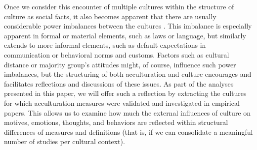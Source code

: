 \documentclass[man, 12pt, a4paper]{apa7}
\begin{document}
Once we consider this encounter of multiple cultures within the structure of culture as social facts, it also becomes apparent that there are usually considerable power imbalances between the cultures \citep[e.g., see][]{Bhatia2001}. This imbalance is especially apparent in formal or material elements, such as laws or language, but similarly extends to more informal elements, such as default expectations in communication or behavioral norms and customs. Factors such as cultural distance \citep{Triandis2001} or majority group's attitudes \citep[e.g.,][]{Berry1997b, Berry2003} might, of course, influence such power imbalances, but the structuring of both acculturation and culture encourages and facilitates reflections and discussions of these issues. As part of the analyses presented in this paper, we will offer such a reflection by extracting the cultures for which acculturation measures were validated and investigated in empirical papers. This allows us to examine how much the external influences of culture on motives, emotions, thoughts, and behaviors are reflected within structural differences of measures and definitions (that is, if we can consolidate a meaningful number of studies per cultural context).
\end{document}
